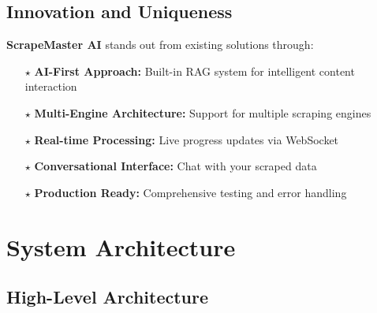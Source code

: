 \documentclass[12pt,a4paper]{report}
\begin{document}
\section{Innovation and Uniqueness}

\textbf{ScrapeMaster AI} stands out from existing solutions through:

\begin{itemize}[leftmargin=2cm]
    \item[\textcolor{warningred}{$\star$}] \textbf{AI-First Approach:} Built-in RAG system for intelligent content interaction
    \item[\textcolor{warningred}{$\star$}] \textbf{Multi-Engine Architecture:} Support for multiple scraping engines
    \item[\textcolor{warningred}{$\star$}] \textbf{Real-time Processing:} Live progress updates via WebSocket
    \item[\textcolor{warningred}{$\star$}] \textbf{Conversational Interface:} Chat with your scraped data
    \item[\textcolor{warningred}{$\star$}] \textbf{Production Ready:} Comprehensive testing and error handling
\end{itemize}

\chapter{System Architecture}

\section{High-Level Architecture}
\end{document}
